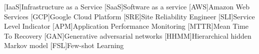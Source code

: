[IaaS]{Infrastructure as a Service}
[SaaS]{Software as a service}
[AWS]{Amazon Web Services}
[GCP]{Google Cloud Platform}
[SRE]{Site Reliability Engineer}
[SLI]{Service Level Indicator}
[APM]{Application Performance Monitoring}
[MTTR]{Mean Time To Recovery}
[GAN]{Generative adversarial networks}
[HHMM]{Hierarchical hidden Markov model}
[FSL]{Few-shot Learning}
